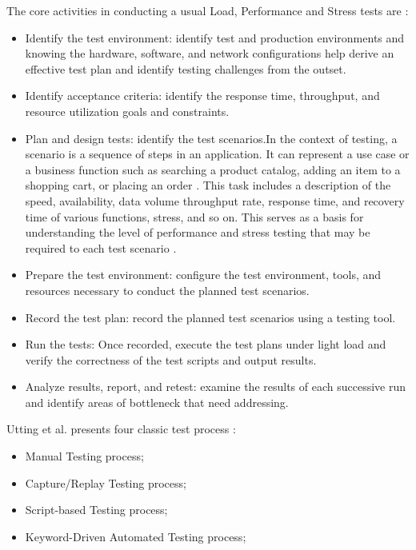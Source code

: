 \documentclass[espaco=umemeio,chapter=TITLE,twoside,openright]{abnt}
\begin{document}
The core activities in conducting a usual Load, Performance and Stress tests are \cite{Erinle2013}:

\begin{itemize}
\item Identify the test environment: identify test and production environments and knowing the hardware, software, and network configurations help derive an effective test plan and identify testing challenges from the outset.

\item Identify acceptance criteria: identify the response time, throughput, and resource utilization goals and constraints.

\item Plan and design tests: identify the test scenarios.In the context of testing, a scenario is a sequence of steps in an application. It can represent a use case or a business function such as searching a product catalog, adding an item to a shopping cart, or placing an order \cite{Corporation2007}. This task includes a description
of the speed, availability, data volume throughput rate, response
time, and recovery time of various functions, stress, and so on. This
serves as a basis for understanding the level of performance and
stress testing that may be required to each test scenario \cite{Lewis2005}.

\item Prepare the test environment: configure the test environment, tools, and resources necessary to conduct the planned test scenarios.

\item Record the test plan: record the planned test scenarios using a testing tool.

\item Run the tests: Once recorded, execute the test plans under light load and verify the correctness of the test scripts and output results.

\item Analyze results, report, and retest: examine the results of each successive run and identify areas of bottleneck that need addressing.

\end{itemize}

Utting et al. presents four classic test process \cite{utting2010practical}: 

\begin{itemize}
\item Manual Testing process;
\item Capture/Replay Testing process; 
\item Script-based Testing process;
\item Keyword-Driven Automated Testing process;

\end{itemize}
\end{document}

